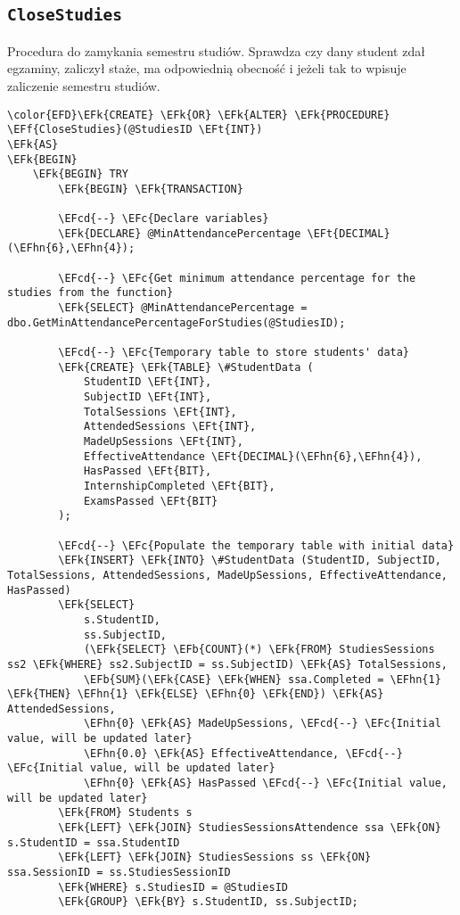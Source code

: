 \documentclass[11pt]{article}
\newcommand{\EFc}[1]{\textcolor{EFc}{\textit{#1}}} %
\newcommand{\EFcd}[1]{\textcolor{EFcd}{\textit{#1}}} %
\newcommand{\EFk}[1]{\textcolor{EFk}{\textbf{#1}}} %
\newcommand{\EFb}[1]{\textcolor{EFb}{\textbf{#1}}} %
\newcommand{\EFf}[1]{\textcolor{EFf}{#1}} %
\newcommand{\EFt}[1]{\textcolor{EFt}{\textbf{#1}}} %
\newcommand{\EFhn}[1]{\textcolor{EFhn}{#1}} %
\begin{document}
\subsection{\texttt{CloseStudies}}
\label{sec:org1f1b217}
Procedura do zamykania semestru studiów. Sprawdza czy dany student zdał egzaminy, zaliczył staże, ma odpowiednią obecność i jeżeli tak to wpisuje zaliczenie semestru studiów.
\begin{Code}
\begin{Verbatim}
\color{EFD}\EFk{CREATE} \EFk{OR} \EFk{ALTER} \EFk{PROCEDURE} \EFf{CloseStudies}(@StudiesID \EFt{INT})
\EFk{AS}
\EFk{BEGIN}
    \EFk{BEGIN} TRY
        \EFk{BEGIN} \EFk{TRANSACTION}

        \EFcd{--} \EFc{Declare variables}
        \EFk{DECLARE} @MinAttendancePercentage \EFt{DECIMAL}(\EFhn{6},\EFhn{4});

        \EFcd{--} \EFc{Get minimum attendance percentage for the studies from the function}
        \EFk{SELECT} @MinAttendancePercentage = dbo.GetMinAttendancePercentageForStudies(@StudiesID);

        \EFcd{--} \EFc{Temporary table to store students' data}
        \EFk{CREATE} \EFk{TABLE} \#StudentData (
            StudentID \EFt{INT},
            SubjectID \EFt{INT},
            TotalSessions \EFt{INT},
            AttendedSessions \EFt{INT},
            MadeUpSessions \EFt{INT},
            EffectiveAttendance \EFt{DECIMAL}(\EFhn{6},\EFhn{4}),
            HasPassed \EFt{BIT},
            InternshipCompleted \EFt{BIT},
            ExamsPassed \EFt{BIT}
        );

        \EFcd{--} \EFc{Populate the temporary table with initial data}
        \EFk{INSERT} \EFk{INTO} \#StudentData (StudentID, SubjectID, TotalSessions, AttendedSessions, MadeUpSessions, EffectiveAttendance, HasPassed)
        \EFk{SELECT} 
            s.StudentID,
            ss.SubjectID,
            (\EFk{SELECT} \EFb{COUNT}(*) \EFk{FROM} StudiesSessions ss2 \EFk{WHERE} ss2.SubjectID = ss.SubjectID) \EFk{AS} TotalSessions,
            \EFb{SUM}(\EFk{CASE} \EFk{WHEN} ssa.Completed = \EFhn{1} \EFk{THEN} \EFhn{1} \EFk{ELSE} \EFhn{0} \EFk{END}) \EFk{AS} AttendedSessions,
            \EFhn{0} \EFk{AS} MadeUpSessions, \EFcd{--} \EFc{Initial value, will be updated later}
            \EFhn{0.0} \EFk{AS} EffectiveAttendance, \EFcd{--} \EFc{Initial value, will be updated later}
            \EFhn{0} \EFk{AS} HasPassed \EFcd{--} \EFc{Initial value, will be updated later}
        \EFk{FROM} Students s
        \EFk{LEFT} \EFk{JOIN} StudiesSessionsAttendence ssa \EFk{ON} s.StudentID = ssa.StudentID
        \EFk{LEFT} \EFk{JOIN} StudiesSessions ss \EFk{ON} ssa.SessionID = ss.StudiesSessionID
        \EFk{WHERE} s.StudiesID = @StudiesID
        \EFk{GROUP} \EFk{BY} s.StudentID, ss.SubjectID;



\end{Verbatim}
\end{Code}
\end{document}
